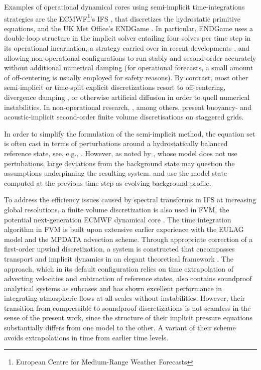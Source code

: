 \documentclass{ametsoc}
\theoremstyle{definition}
\begin{document}
Examples of operational dynamical cores using semi-implicit time-integrations strategies are the ECMWF\footnote{European Centre for Medium-Range Weather Forecasts}'s IFS \citep{Hortal2002}, that discretizes the hydrostatic primitive equations, and the UK Met Office's ENDGame \citep{WoodEtAl2013, BenacchioWood2016}. In particular, ENDGame  uses a double-loop structure in the implicit solver entailing four solves per time step in its operational incarnation, a strategy carried over in recent developments \citep{MelvinEtAl2018}, and allowing non-operational configurations to run stably and second-order accurately without additional numerical damping (for operational forecasts, a small amount of off-centering is usually employed for safety reasons). By contrast, most other semi-implicit or time-split explicit discretizations resort to off-centering, divergence damping \citep{BryanFritsch2002}, or otherwise artificial diffusion in order to quell numerical instabilities. In non-operational research, \cite{DumbserEtAl2018}, among others, present buoyancy- and acoustic-implicit second-order finite volume discretisations on staggered grids.

In order to simplify the formulation of the semi-implicit method, the equation set is often cast in terms of perturbations around a hydrostatically balanced reference state, see, e.g., \cite{RestelliGiraldo2009,SmolarkiewiczEtAl2014,SmolarkiewiczEtAl2019}. However, as noted by \cite{WellerShahrokhi2014}, whose model does not use pertubations, large deviations from the background state may question the assumptions underpinning the resulting system. \cite{WoodEtAl2013} and \cite{MelvinEtAl2018} use the model state computed at the previous time step as evolving background profile.

To address the efficiency issues caused by spectral transforms in IFS at increasing global resolutions, a finite volume discretization is also used in FVM, the potential next-generation ECMWF dynamical core \citep{KuehnleinEtAl2019}. The time integration algorithm in FVM is built upon extensive earlier experience with the EULAG model and the MPDATA advection scheme. Through appropriate correction of a first-order upwind discretization, a system is constructed that encompasses transport and implicit dynamics in an elegant theoretical framework \citep[and references therein]{SmolarkiewiczEtAl2014, SmolarkiewiczEtAl2016}. The approach, which in its default configuration relies on time extrapolation of advecting velocities and subtraction of reference states, also contains soundproof analytical systems as subcases and has shown excellent performance in integrating atmospheric flows at all scales without instabilities. However, their transition from compressible to soundproof discretizations is not seamless in the sense of the present work, since the structure of their implicit pressure equations substantially differs from one model to the other. A variant of their scheme avoids extrapolations in time from earlier time levels.
\end{document}
